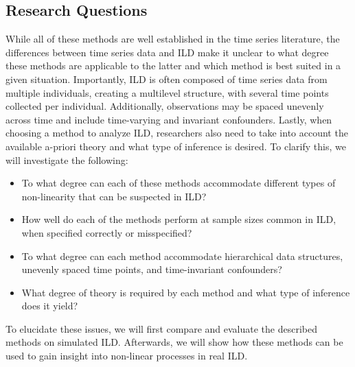 \subsection{Research Questions}

While all of these methods are well established in the time series literature,
the differences between time series data and ILD make it unclear to what degree 
these methods are applicable to the latter and which method is best suited in a given 
situation. Importantly, ILD is often composed of time series data from multiple individuals, 
creating a multilevel structure, with several time points collected per individual.
Additionally, observations may be spaced unevenly across time and include time-varying 
and invariant confounders. Lastly, when choosing a method to analyze ILD, researchers 
also need to take into account the available a-priori theory and what type of inference 
is desired. To clarify this, we will investigate the following:

\begin{itemize}
    \item To what degree can each of these methods accommodate different types of non-linearity that can be suspected in ILD?
    \item How well do each of the methods perform at sample sizes common in ILD, when specified correctly or misspecified?
    \item To what degree can each method accommodate hierarchical data structures, unevenly spaced time points, and time-invariant confounders?
    \item What degree of theory is required by each method and what type of inference does it yield? 
\end{itemize}

To elucidate these issues, we will first compare and evaluate the described methods on
simulated ILD. Afterwards, we will show how these methods can be used to gain insight 
into non-linear processes in real ILD.
